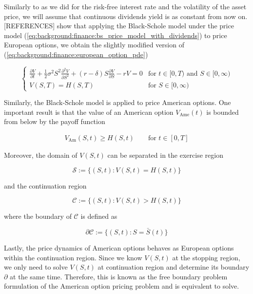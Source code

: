 Similarly to
as we did for the risk-free interest rate and the volatility of the asset price,
we will assume that continuous dividends yield is as constant from now on. [REFERENCES]
show that applying the Black-Schole model under the price model (\ref*{eq:background:finance:bs_price_model_with_dividends}) to price European options,
we obtain the slightly modified version of (\ref*{eq:background:finance:european_option_pde})

\begin{equation}
  \begin{cases}
    \frac{\partial{V}}{\partial{t}} + \frac{1}{2}\sigma^{2} S^2 \frac{\partial^2{V}}{\partial{S^2}} + (r - \delta) S \frac{\partial{V}}{\partial{S}} - rV = 0 & \text{for $t\in[0,T)$ and $S\in[0, \infty)$} \\
    V(S, T) = H(S, T) & \text{for $S\in[0, \infty)$}
  \end{cases}
  \label{eq:chapter2:european_option_pde_with_dividens}
\end{equation}
 
Similarly, the Black-Schole model is applied to price American options. 
One important result is that the value of an American option $V_\text{Ame}(t)$ is
bounded from below by the payoff function

\begin{align}
  V_{\text{Am}}(S, t) \ge H(S, t) \qquad \text{for $t\in[0,T]$}
  \label{eq:background:american_options_price_lower_bound}
\end{align}

Moreover, the domain of $V(S,t)$ can be separated in the exercise region 

\begin{equation}
  \mathcal{S} := \{(S, t): V(S, t) = H(S, t) \}
\end{equation}

and the continuation region 

\begin{equation}
  \mathcal{C} := \{(S, t): V(S, t) > H(S, t) \}
\end{equation}

where the boundary of $\mathcal{C}$ is defined as

\begin{equation}
  \partial \mathcal{C} := \{(S, t): S = \bar{S}(t)\} 
\end{equation}

Lastly, the price dynamics of American options behaves as European options within
the continuation region. Since we know $V(S, t)$ at the stopping region, we only
need to solve $V(S,t)$ at continuation region and determine its boundary $\partial$
at the same time. Therefore, this is known as the free boundary problem formulation
of the American option pricing problem and is equivalent to solve.

